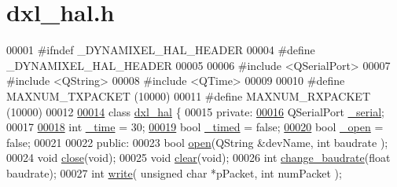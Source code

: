 \hypertarget{dxl__hal_8h_source}{}\section{dxl\+\_\+hal.\+h}
\label{dxl__hal_8h_source}

\begin{DoxyCode}
00001 \textcolor{preprocessor}{#ifndef \_DYNAMIXEL\_HAL\_HEADER}
00004 \textcolor{preprocessor}{#define \_DYNAMIXEL\_HAL\_HEADER}
00005 
00006 \textcolor{preprocessor}{#include <QSerialPort>}
00007 \textcolor{preprocessor}{#include <QString>}
00008 \textcolor{preprocessor}{#include <QTime>}
00009 
00010 \textcolor{preprocessor}{#define MAXNUM\_TXPACKET  (10000)}
00011 \textcolor{preprocessor}{#define MAXNUM\_RXPACKET  (10000)}
00012 
\hypertarget{dxl__hal_8h_source_l00014}{}\hyperlink{classdxl__hal}{00014} \textcolor{keyword}{class }\hyperlink{classdxl__hal}{dxl\_hal} \{
00015 \textcolor{keyword}{private}:
\hypertarget{dxl__hal_8h_source_l00016}{}\hyperlink{classdxl__hal_a785d0e35b81d779b54869cad668f9745}{00016}     QSerialPort \hyperlink{classdxl__hal_a785d0e35b81d779b54869cad668f9745}{\_serial};
00017     
\hypertarget{dxl__hal_8h_source_l00018}{}\hyperlink{classdxl__hal_ae3d8733b5ca778b070218765ca0746ac}{00018}     \textcolor{keywordtype}{int} \hyperlink{classdxl__hal_ae3d8733b5ca778b070218765ca0746ac}{\_time} = 30;
\hypertarget{dxl__hal_8h_source_l00019}{}\hyperlink{classdxl__hal_a10d474daa3ca42b5c5ceb6558a955ca1}{00019}     \textcolor{keywordtype}{bool} \hyperlink{classdxl__hal_a10d474daa3ca42b5c5ceb6558a955ca1}{\_timed} = \textcolor{keyword}{false};
\hypertarget{dxl__hal_8h_source_l00020}{}\hyperlink{classdxl__hal_a04831154c43fe4f7499ea0950e0f0999}{00020}     \textcolor{keywordtype}{bool} \hyperlink{classdxl__hal_a04831154c43fe4f7499ea0950e0f0999}{\_open} = \textcolor{keyword}{false};
00021     
00022 \textcolor{keyword}{public}:
00023     \textcolor{keywordtype}{bool} \hyperlink{classdxl__hal_ab631c2a5533125f14db9a8ec1c33aa7c}{open}(QString &devName, \textcolor{keywordtype}{int} baudrate );
00024     \textcolor{keywordtype}{void} \hyperlink{classdxl__hal_a250fd7e4acabf54d0733551a13e89a2d}{close}(\textcolor{keywordtype}{void});
00025     \textcolor{keywordtype}{void} \hyperlink{classdxl__hal_a004eedde5af69219d7288ec8ea97c89f}{clear}(\textcolor{keywordtype}{void});
00026     \textcolor{keywordtype}{int} \hyperlink{classdxl__hal_a0eaaa5340bc9dce73cc920dc8befe5b0}{change\_baudrate}(\textcolor{keywordtype}{float} baudrate);
00027     \textcolor{keywordtype}{int} \hyperlink{classdxl__hal_a90106970438fb0ab65852730a1c0776a}{write}( \textcolor{keywordtype}{unsigned} \textcolor{keywordtype}{char} *pPacket, \textcolor{keywordtype}{int} numPacket );

\end{DoxyCode}
